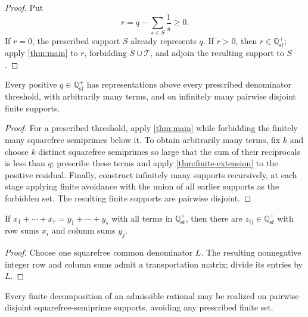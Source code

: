 \begin{proof}
Put
\[
 r=q-\sum_{s\in S}\frac1s\geq0.
\]
If $r=0$, the prescribed support $S$ already represents $q$.  If $r>0$, then $r\in\mathbb Q_{\mathrm{sf}}^+$; apply \cref{thm:main} to $r$, forbidding $S\cup\mathcal T$, and adjoin the resulting support to $S$.
\end{proof}

\begin{corollary}
\label{cor:qualitative-flexibility}
Every positive $q\in\mathbb Q_{\mathrm{sf}}^+$ has representations above every prescribed denominator threshold, with arbitrarily many terms, and on infinitely many pairwise disjoint finite supports.
\end{corollary}

\begin{proof}
For a prescribed threshold, apply \cref{thm:main} while forbidding the finitely many squarefree semiprimes below it.  To obtain arbitrarily many terms, fix $k$ and choose $k$ distinct squarefree semiprimes so large that the sum of their reciprocals is less than $q$; prescribe these terms and apply \cref{thm:finite-extension} to the positive residual.  Finally, construct infinitely many supports recursively, at each stage applying finite avoidance with the union of all earlier supports as the forbidden set.  The resulting finite supports are pairwise disjoint.
\end{proof}

\begin{theorem}
\label{thm:squarefree-row-column}
If $x_1+\cdots+x_r=y_1+\cdots+y_s$ with all terms in $\mathbb Q_{\mathrm{sf}}^+$, then there are $z_{ij}\in\mathbb Q_{\mathrm{sf}}^+$ with row sums $x_i$ and column sums $y_j$.
\end{theorem}

\begin{proof}
Choose one squarefree common denominator $L$.  The resulting nonnegative integer row and column sums admit a transportation matrix; divide its entries by $L$.
\end{proof}

\begin{corollary}
\label{cor:disjoint-realization}
Every finite decomposition of an admissible rational may be realized on pairwise disjoint squarefree-semiprime supports, avoiding any prescribed finite set.
\end{corollary}

